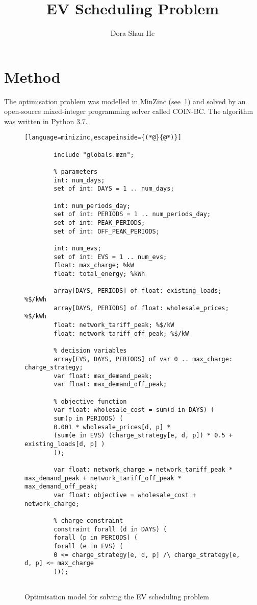 \documentclass[a4paper, oneandhalfspace]{llncs}
\title{EV Scheduling Problem}
\author{Dora Shan He}
\institute{
	Monash University
	\\\texttt{dora.shan.he@gmail.com}}
\begin{document}
\maketitle

\section{Method}

The optimisation problem was modelled in MinZinc (see~\ref{model:mip}) and solved by an open-source mixed-integer programming solver called COIN-BC. The algorithm was written in Python 3.7. 

\begin{figure}[hp!]
	\centering
	\caption{Optimisation model for solving the EV scheduling problem}
	\label{model:mip}
	\begin{lstlisting}[language=minizinc,escapeinside={(*@}{@*)}]
		
		include "globals.mzn";
		
		% parameters
		int: num_days;
		set of int: DAYS = 1 .. num_days;
		
		int: num_periods_day;
		set of int: PERIODS = 1 .. num_periods_day;
		set of int: PEAK_PERIODS;
		set of int: OFF_PEAK_PERIODS;
		
		int: num_evs;
		set of int: EVS = 1 .. num_evs;
		float: max_charge; %kW
		float: total_energy; %kWh
		
		array[DAYS, PERIODS] of float: existing_loads; %$/kWh
		array[DAYS, PERIODS] of float: wholesale_prices; %$/kWh
		float: network_tariff_peak; %$/kW
		float: network_tariff_off_peak; %$/kW
		
		% decision variables
		array[EVS, DAYS, PERIODS] of var 0 .. max_charge: charge_strategy;
		var float: max_demand_peak; 
		var float: max_demand_off_peak;
		
		% objective function
		var float: wholesale_cost = sum(d in DAYS) (
		sum(p in PERIODS) (
		0.001 * wholesale_prices[d, p] * 
		(sum(e in EVS) (charge_strategy[e, d, p]) * 0.5 + existing_loads[d, p] )
		));
		
		var float: network_charge = network_tariff_peak * max_demand_peak + network_tariff_off_peak * max_demand_off_peak;
		var float: objective = wholesale_cost + network_charge;
		
		% charge constraint
		constraint forall (d in DAYS) (
		forall (p in PERIODS) (
		forall (e in EVS) (
		0 <= charge_strategy[e, d, p] /\ charge_strategy[e, d, p] <= max_charge
		)));
		

\end{lstlisting}
\end{figure}
\end{document}
